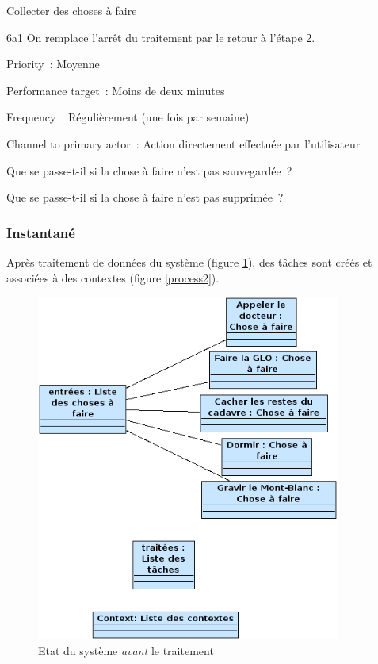 \begin{usecase}{Collecter des choses à faire}
\begin{variation}
\item[6a1] On remplace l'arrêt du traitement par le retour à l'étape 2.
\\
\end{variation}
\begin{relatedinformation}
\item[Priority~:] Moyenne
\item[Performance target~:] Moins de deux minutes
\item[Frequency~:] Régulièrement (une fois par semaine)
\item[Channel to primary actor~:] Action directement effectuée par l'utilisateur
\\
\end{relatedinformation}
\begin{openissues}
\item Que se passe-t-il si la chose à faire n'est pas sauvegardée~?
\item Que se passe-t-il si la chose à faire n'est pas supprimée~?
\\
\end{openissues}
\end{usecase}

\subsubsection{Instantané}

Après traitement de données du système (figure \ref{process1}), des tâches sont créés et associées à des contextes (figure \ref{process2}).

\begin{figure}[!ht]
\begin{center}
\includegraphics[width=10cm]{images/Instantane_Process_1.png}
\caption{Etat du système \emph{avant} le traitement}
\label{process1}
\end{center}
\end{figure}

